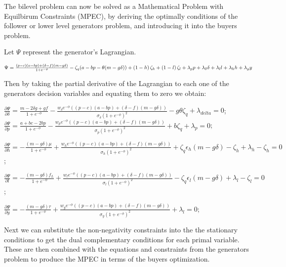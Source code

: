 The bilevel problem can now be solved as a Mathematical Problem with  Equilbirum Constraints (MPEC), by deriving the optimally conditions of the follower or lower level generators problem, and introducing it into the buyers problem.

Let $\Psi$ represent the generator's Lagrangian.  

$\Psi =\frac{\left(p-c\right)(a - bp )+\left(\delta-f\right)(m -g\delta)}{1+e^{-\phi}} - \zeta_q(a - bp -\theta (m -g\delta))+\left( 1-h\right)\zeta_h+\left( 1-l\right)\zeta_l \\ +\lambda_p p+\lambda_{\delta} \delta+\lambda_l l +\lambda_h h+\lambda_y y  $

Then by taking the partial derivative of the Lagrangian to each one of the generators decision variables and equating them to zero we obtain:

$\frac{\partial \Psi}{\partial \delta} = \frac{m-2\delta g + g f}{1+e^{-\phi}}-\frac{w_{\delta} e^{-\phi} \left(\left(p-c\right)(a - bp )  +\left(\delta-f\right)(m -g\delta)\right)}{\sigma_{\delta}(1+e^{-\phi})^{2}}-g \theta \zeta_q + \lambda_{delta} =0 $;
$\frac{\partial \Psi}{\partial p} = \frac{a+bc-2bp}{1+e^{-\phi}}-\frac{w_p e^{-\phi} \left(\left(p-c\right)(a - bp )  +\left(\delta-f\right)(m -g\delta)\right)}{\sigma_{p}(1+e^{-\phi})^{2}}+b \zeta_q + \lambda_{p}  =0 $;

$\frac{\partial \Psi}{\partial h} = -\frac{\left(m-g\delta\right)\mu}{1+e^{-\phi}}+{\frac{w_h e^{-\phi} \left(\left(p-c\right)(a - bp )  +\left(\delta-f\right)(m -g\delta)\right)}{\sigma_{h}(1+e^{-\phi})^{2}}}+\zeta_q \epsilon_h \left( m-g\delta\right)-\zeta_h+ \lambda_{h}-\zeta_h  =0 $;

$\frac{\partial \Psi}{\partial l} =  -\frac{\left(m-g\delta\right)f_{L}}{1+e^{-\phi}}+{\frac{w_l e^{-\phi} \left(\left(p-c\right)(a - bp )  +\left(\delta-f\right)(m -g\delta)\right)}{\sigma_{l}(1+e^{-\phi})^{2}}}-\zeta_q \epsilon_l \left( m-g\delta\right)+ \lambda_{l}  -\zeta_l=0 $;

$\frac{\partial \Psi}{\partial y} = -\frac{\left(m-g\delta\right)\tau}{1+e^{-\phi}}+ {\frac{w_y e^{-\phi} \left(\left(p-c\right)(a - bp )  +\left(\delta-f\right)(m -g\delta)\right)}{\sigma_{y}(1+e^{-\phi})^{2}}}+\lambda_{l}  =0 $;

Next we can substitute the non-negativity constraints into the the stationary conditions to get the dual complementary conditions for each primal variable. These are then combined with the equations and constraints from the generators problem to produce the MPEC in terms of the buyers optimization.

